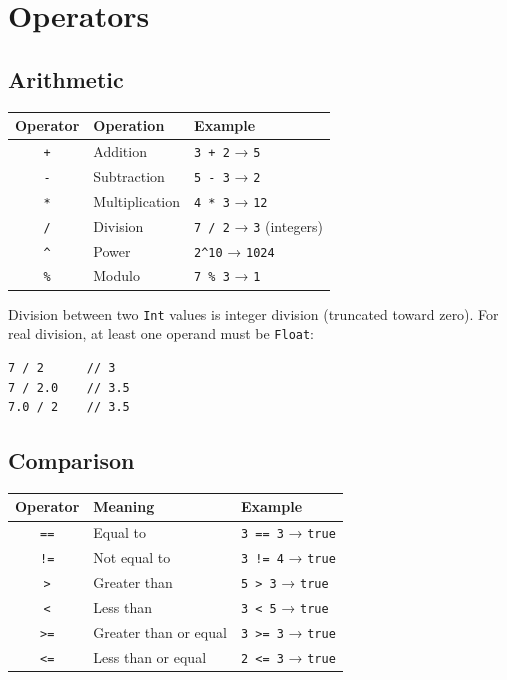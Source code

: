 \chapter{Operators}

\section{Arithmetic}

\begin{center}
\begin{tabular}{cll}
\toprule
\textbf{Operator} & \textbf{Operation} & \textbf{Example} \\
\midrule
\texttt{+}  & Addition       & \texttt{3 + 2} → \texttt{5} \\
\texttt{-}  & Subtraction    & \texttt{5 - 3} → \texttt{2} \\
\texttt{*}  & Multiplication & \texttt{4 * 3} → \texttt{12} \\
\texttt{/}  & Division       & \texttt{7 / 2} → \texttt{3} (integers) \\
\texttt{\^} & Power          & \texttt{2\^{}10} → \texttt{1024} \\
\texttt{\%} & Modulo         & \texttt{7 \% 3} → \texttt{1} \\
\bottomrule
\end{tabular}
\end{center}

Division between two \texttt{Int} values is integer division (truncated
toward zero). For real division, at least one operand must be
\texttt{Float}:

\begin{lstlisting}
7 / 2      // 3
7 / 2.0    // 3.5
7.0 / 2    // 3.5
\end{lstlisting}

\section{Comparison}

\begin{center}
\begin{tabular}{cll}
\toprule
\textbf{Operator} & \textbf{Meaning} & \textbf{Example} \\
\midrule
\texttt{==} & Equal to              & \texttt{3 == 3} → \texttt{true} \\
\texttt{!=} & Not equal to          & \texttt{3 != 4} → \texttt{true} \\
\texttt{>}  & Greater than          & \texttt{5 > 3}  → \texttt{true} \\
\texttt{<}  & Less than             & \texttt{3 < 5}  → \texttt{true} \\
\texttt{>=} & Greater than or equal & \texttt{3 >= 3} → \texttt{true} \\
\texttt{<=} & Less than or equal    & \texttt{2 <= 3} → \texttt{true} \\
\bottomrule
\end{tabular}
\end{center}

